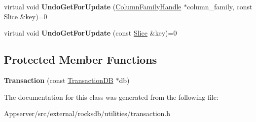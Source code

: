 \begin{DoxyCompactItemize}
\item 
virtual void {\bfseries Undo\+Get\+For\+Update} (\hyperlink{classrocksdb_1_1ColumnFamilyHandle}{Column\+Family\+Handle} $\ast$column\+\_\+family, const \hyperlink{classrocksdb_1_1Slice}{Slice} \&key)=0\hypertarget{classrocksdb_1_1Transaction_a9839f10ba1df677fd9f2214409990916}{}\label{classrocksdb_1_1Transaction_a9839f10ba1df677fd9f2214409990916}

\item 
virtual void {\bfseries Undo\+Get\+For\+Update} (const \hyperlink{classrocksdb_1_1Slice}{Slice} \&key)=0\hypertarget{classrocksdb_1_1Transaction_a4abb04c9b8251edfb83a6140039908a0}{}\label{classrocksdb_1_1Transaction_a4abb04c9b8251edfb83a6140039908a0}

\end{DoxyCompactItemize}
\subsection*{Protected Member Functions}
\begin{DoxyCompactItemize}
\item 
{\bfseries Transaction} (const \hyperlink{classrocksdb_1_1TransactionDB}{Transaction\+DB} $\ast$db)\hypertarget{classrocksdb_1_1Transaction_ae0e4ad54eb90b19600629b31d4e46acd}{}\label{classrocksdb_1_1Transaction_ae0e4ad54eb90b19600629b31d4e46acd}

\end{DoxyCompactItemize}


The documentation for this class was generated from the following file\+:\begin{DoxyCompactItemize}
\item 
Appserver/src/external/rocksdb/utilities/transaction.\+h\end{DoxyCompactItemize}
